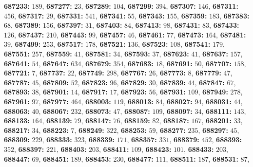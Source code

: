 \textsf{\bfseries 687233:} $189$, \textsf{\bfseries 687277:} $23$, \textsf{\bfseries 687289:} $104$, \textsf{\bfseries 687299:} $394$, \textsf{\bfseries 687307:} $146$, \textsf{\bfseries 687311:} $456$, \textsf{\bfseries 687317:} $29$, \textsf{\bfseries 687331:} $541$, \textsf{\bfseries 687341:} $55$, \textsf{\bfseries 687343:} $155$, \textsf{\bfseries 687359:} $183$, \textsf{\bfseries 687383:} $68$, \textsf{\bfseries 687389:} $156$, \textsf{\bfseries 687397:} $31$, \textsf{\bfseries 687403:} $84$, \textsf{\bfseries 687413:} $98$, \textsf{\bfseries 687431:} $83$, \textsf{\bfseries 687433:} $126$, \textsf{\bfseries 687437:} $210$, \textsf{\bfseries 687443:} $99$, \textsf{\bfseries 687457:} $46$, \textsf{\bfseries 687461:} $77$, \textsf{\bfseries 687473:} $164$, \textsf{\bfseries 687481:} $39$, \textsf{\bfseries 687499:} $253$, \textsf{\bfseries 687517:} $178$, \textsf{\bfseries 687521:} $136$, \textsf{\bfseries 687523:} $108$, \textsf{\bfseries 687541:} $179$, \textsf{\bfseries 687551:} $257$, \textsf{\bfseries 687559:} $41$, \textsf{\bfseries 687581:} $34$, \textsf{\bfseries 687593:} $37$, \textsf{\bfseries 687623:} $41$, \textsf{\bfseries 687637:} $157$, \textsf{\bfseries 687641:} $54$, \textsf{\bfseries 687647:} $634$, \textsf{\bfseries 687679:} $354$, \textsf{\bfseries 687683:} $18$, \textsf{\bfseries 687691:} $50$, \textsf{\bfseries 687707:} $158$, \textsf{\bfseries 687721:} $7$, \textsf{\bfseries 687737:} $22$, \textsf{\bfseries 687749:} $298$, \textsf{\bfseries 687767:} $26$, \textsf{\bfseries 687773:} $8$, \textsf{\bfseries 687779:} $47$, \textsf{\bfseries 687787:} $45$, \textsf{\bfseries 687809:} $52$, \textsf{\bfseries 687823:} $96$, \textsf{\bfseries 687829:} $30$, \textsf{\bfseries 687839:} $44$, \textsf{\bfseries 687847:} $67$, \textsf{\bfseries 687893:} $38$, \textsf{\bfseries 687901:} $14$, \textsf{\bfseries 687917:} $17$, \textsf{\bfseries 687923:} $56$, \textsf{\bfseries 687931:} $109$, \textsf{\bfseries 687949:} $278$, \textsf{\bfseries 687961:} $97$, \textsf{\bfseries 687977:} $464$, \textsf{\bfseries 688003:} $119$, \textsf{\bfseries 688013:} $84$, \textsf{\bfseries 688027:} $94$, \textsf{\bfseries 688031:} $44$, \textsf{\bfseries 688063:} $40$, \textsf{\bfseries 688067:} $232$, \textsf{\bfseries 688073:} $47$, \textsf{\bfseries 688087:} $109$, \textsf{\bfseries 688097:} $34$, \textsf{\bfseries 688111:} $143$, \textsf{\bfseries 688133:} $164$, \textsf{\bfseries 688139:} $79$, \textsf{\bfseries 688147:} $76$, \textsf{\bfseries 688159:} $82$, \textsf{\bfseries 688187:} $167$, \textsf{\bfseries 688201:} $33$, \textsf{\bfseries 688217:} $34$, \textsf{\bfseries 688223:} $7$, \textsf{\bfseries 688249:} $322$, \textsf{\bfseries 688253:} $59$, \textsf{\bfseries 688277:} $235$, \textsf{\bfseries 688297:} $45$, \textsf{\bfseries 688309:} $229$, \textsf{\bfseries 688333:} $323$, \textsf{\bfseries 688339:} $171$, \textsf{\bfseries 688357:} $331$, \textsf{\bfseries 688379:} $452$, \textsf{\bfseries 688393:} $352$, \textsf{\bfseries 688397:} $221$, \textsf{\bfseries 688403:} $203$, \textsf{\bfseries 688411:} $109$, \textsf{\bfseries 688423:} $101$, \textsf{\bfseries 688433:} $203$, \textsf{\bfseries 688447:} $69$, \textsf{\bfseries 688451:} $189$, \textsf{\bfseries 688453:} $230$, \textsf{\bfseries 688477:} $111$, \textsf{\bfseries 688511:} $187$, \textsf{\bfseries 688531:} $87$, 
